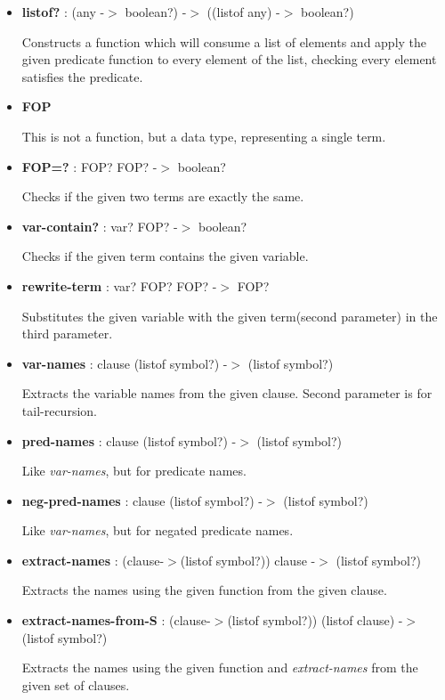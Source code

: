 \documentclass[11pt]{report}
\begin{document}
\begin{appendices}
\begin{itemize}
 \item \textbf{listof?} : (any -$>$ boolean?) -$>$ ((listof any) -$>$ boolean?)

Constructs a function which will consume a list of elements and apply the given predicate function to every element of the list, checking every element satisfies the predicate.

 \item \textbf{FOP}

This is not a function, but a data type, representing a single term. 

 \item \textbf{FOP=?} : FOP? FOP? -$>$ boolean?

Checks if the given two terms are exactly the same.

 \item \textbf{var-contain?} : var? FOP? -$>$ boolean?

Checks if the given term contains the given variable.

 \item \textbf{rewrite-term} : var? FOP? FOP? -$>$ FOP?

Substitutes the given variable with the given term(second parameter) in the third parameter.

 \item \textbf{var-names} : clause (listof symbol?) -$>$ (listof symbol?)

Extracts the variable names from the given clause. Second parameter is for tail-recursion.

 \item \textbf{pred-names} : clause (listof symbol?) -$>$ (listof symbol?)

Like \textit{var-names}, but for predicate names.

 \item \textbf{neg-pred-names} : clause (listof symbol?) -$>$ (listof symbol?)

Like \textit{var-names}, but for negated predicate names.

 \item \textbf{extract-names} : (clause-$>$(listof symbol?)) clause -$>$ (listof symbol?)

Extracts the names using the given function from the given clause.

 \item \textbf{extract-names-from-S} : (clause-$>$(listof symbol?)) (listof clause) -$>$ (listof symbol?)

Extracts the names using the given function and \textit{extract-names} from the given set of clauses.


\end{itemize}
\end{appendices}
\end{document}
